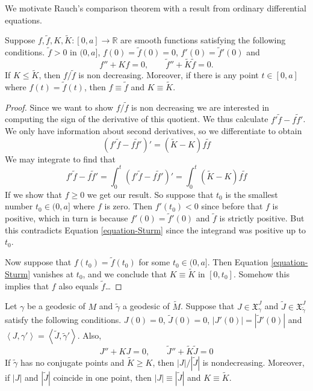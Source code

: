 We motivate Rauch's comparison theorem with a result from ordinary
differential equations.

\begin{theorem}[Sturm]
\label{theorem-Sturm}
Suppose $f,\tilde{f},K,\tilde{K}:[0,a]\to \mathbb{R}$ are smooth functions
satisfying the following conditions. $\tilde{f} > 0$ in $(0,a]$, $f(0)=\tilde{f}(0)=0$,
$f'(0)=\tilde{f}'(0)$ and
$$
f''+Kf=0,\qquad \tilde{f}''+\tilde{K}\tilde{f}=0.
$$
If $K\leq \tilde{K}$, then $f/\tilde{f}$ is non decreasing. Moreover, if there
is any point $t \in [0,a]$ where $f(t)=\tilde{f}(t)$, then $f \equiv \tilde{f}$
and $K \equiv \tilde{K}$.
\end{theorem}

\begin{proof}
Since we want to show $f/\tilde{f}$ is non decreasing we are interested in
computing the sign of the derivative of this quotient. We thus calculate 
$f'\tilde{f}-f \tilde{f}'$. We only have information about second derivatives,
so we differentiate to obtain
$$
(f'\tilde{f}-f \tilde{f}')'=(\tilde{K}-K)f\tilde{f}
$$
We may integrate to find that 
\begin{equation}
\label{equation-Sturm}
f'\tilde{f}-f \tilde{f}'=\int_0^t (f'\tilde{f}-f \tilde{f}')'
=\int_0^t (\tilde{K}-K)f\tilde{f}
\end{equation}
If we show that $f\geq 0$ we get our result. So suppose that $t_0$ is the
smallest number $t_0 \in (0,a]$ where $f$ is zero. Then $f'(t_0)<0$ since before
that $f$ is positive, which in turn is because $f'(0)=\tilde{f}'(0)$ and
$\tilde{f}$ is strictly positive. But this contradicts Equation
\ref{equation-Sturm} since the integrand was positive up to $t_0$.

Now suppose that $f(t_0)=\tilde{f}(t_0)$ for some $t_0 \in (0,a]$. Then Equation
\ref{equation-Sturm} vanishes at $t_0$, and we conclude that $K \equiv
\tilde{K}$ in $[0,t_0]$. Somehow this implies that $f$ also equals $\tilde{f}$…
\end{proof}

\begin{theorem}[Rauch]
\label{theorem-Rauch}
Let $\gamma$ be a geodesic of $M$ and $\tilde{\gamma}$ a geodesic of
$\tilde{M}$. Suppose that $J \in \mathfrak{X}^J_\gamma$ and $\tilde{J}\in
\mathfrak{X}^J_{\tilde{\gamma}}$ satisfy the following conditions. $J(0)=0$,
$\tilde{J}(0)=0$, $|J'(0)|=|\tilde{J}'(0)|$ and 
$\left<J,\gamma'\right>=\left<\tilde{J},\tilde{\gamma}'\right>$. Also,
$$
J''+K J=0,\qquad \tilde{J}''+\tilde{K}\tilde{J}=0
$$
If $\tilde{\gamma}$ has no conjugate points and $\tilde{K}\geq K$, then 
$|J|/|\tilde{J}|$ is nondecreasing. Moreover, if $|J|$ and $|\tilde{J}|$
coincide in one point, then $|J|\equiv |\tilde{J}|$ and $K \equiv \tilde{K}$.
\end{theorem}


